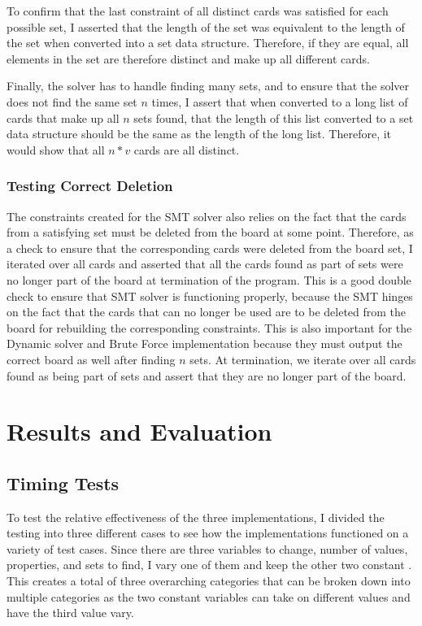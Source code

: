 \documentclass[pageno]{jpaper}
\begin{document}
To confirm that the last constraint of all distinct cards was satisfied for each possible set, I asserted that the length of the set was equivalent to the length of the set when converted into a set data structure. Therefore, if they are equal, all elements in the set are therefore distinct and make up all different cards.

Finally, the solver has to handle finding many sets, and to ensure that the solver does not find the same set $n$ times, I assert that when converted to a long list of cards that make up all $n$ sets found, that the length of this list converted to a set data structure should be the same as the length of the long list. Therefore, it would show that all $n*v$ cards are all distinct. 

\subsubsection{Testing Correct Deletion}

The constraints created for the SMT solver also relies on the fact that the cards from a satisfying set must be deleted from the board at some point. Therefore, as a check to ensure that the corresponding cards were deleted from the board set, I iterated over all cards and asserted that all the cards found as part of sets were no longer part of the board at termination of the program. This is a good double check to ensure that SMT solver is functioning properly, because the SMT hinges on the fact that the cards that can no longer be used are to be deleted from the board for rebuilding the corresponding constraints. This is also important for the Dynamic solver and Brute Force implementation because they must output the correct board as well after finding $n$ sets. At termination, we iterate over all cards found as being part of sets and assert that they are no longer part of the board.

\section{Results and Evaluation}



\subsection{Timing Tests}

To test the relative effectiveness of the three implementations, I divided the testing into three different cases to see how the implementations functioned on a variety of test cases. Since there are three variables to change, number of values, properties, and sets to find, I vary one of them and keep the other two constant . This creates a total of three overarching categories that can be broken down into multiple categories as the two constant variables can take on different values and have the third value vary. 
\end{document}
